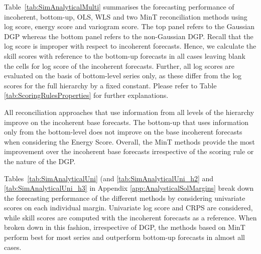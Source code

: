 \documentclass[12pt]{article}
\theoremstyle{definition}
\begin{document}

Table~\ref{tab:SimAnalyticalMulti} summarises the forecasting performance of incoherent, bottom-up, OLS, WLS and two MinT reconciliation methods using log score, energy score and variogram score. The top panel refers to the Gaussian DGP whereas the bottom panel refers to the non-Gaussian DGP. Recall that the log score is improper with respect to incoherent forecasts. Hence, we calculate the skill scores with reference to the bottom-up forecasts in all cases leaving blank the cells for log score of the incoherent forecasts. Further, all log scores are evaluated on the basis of bottom-level series only, as these differ from the log scores for the full hierarchy by a fixed constant. Please refer to Table \ref{tab:ScoringRulesProperties} for further explanations.

All reconciliation approaches that use information from all levels of the hierarchy improve on the incoherent base forecasts. The bottom-up that uses information only from the bottom-level does not improve on the base incoherent forecasts when considering the Energy Score. Overall, the MinT methods provide the most improvement over the incoherent base forecasts irrespective of the scoring rule or the nature of the DGP.

Tables~\ref{tab:SimAnalyticalUni} (and \ref{tab:SimAnalyticalUni_h2} and \ref{tab:SimAnalyticalUni_h3} in Appendix \ref{app:AnalysticalSolMargins} break down the forecasting performance of the different methods by considering univariate scores on each individual margin. Univariate log score and CRPS are considered, while skill scores are computed with the incoherent forecasts as a reference. When broken down in this fashion, irrespective of DGP, the methods based on MinT perform best for most series and outperform bottom-up forecasts in almost all cases.
\end{document}
